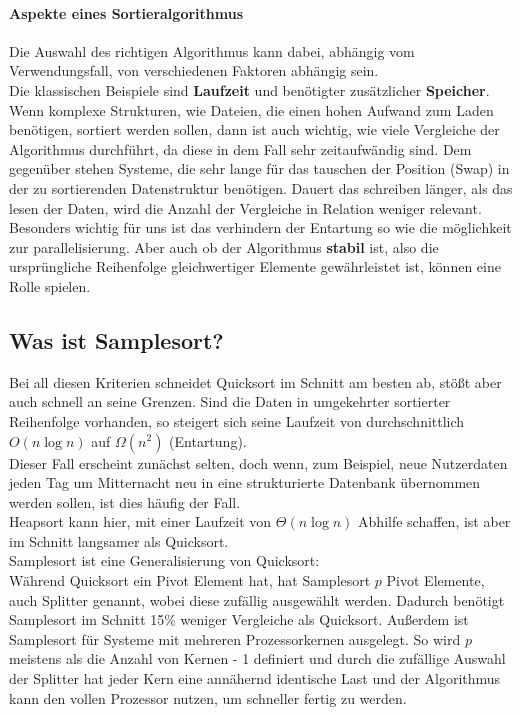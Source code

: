 		\paragraph{Aspekte eines Sortieralgorithmus}
			Die Auswahl des richtigen Algorithmus kann dabei, abhängig vom Verwendungsfall, von verschiedenen Faktoren abhängig sein.\\
			Die klassischen Beispiele sind \textbf{Laufzeit} und benötigter zusätzlicher \textbf{Speicher}.
			Wenn komplexe Strukturen, wie Dateien, die einen hohen Aufwand zum Laden benötigen, sortiert werden sollen, dann ist auch wichtig, wie viele Vergleiche der Algorithmus durchführt, da diese in dem Fall sehr zeitaufwändig sind.
			Dem gegenüber stehen Systeme, die sehr lange für das tauschen der Position (Swap) in der zu sortierenden Datenstruktur benötigen.
			Dauert das schreiben länger, als das lesen der Daten, wird die Anzahl der Vergleiche in Relation weniger relevant.\\
			Besonders wichtig für uns ist das verhindern der Entartung so wie die möglichkeit zur parallelisierung.
			Aber auch ob der Algorithmus \textbf{stabil} ist, also die ursprüngliche Reihenfolge gleichwertiger Elemente gewährleistet ist, können eine Rolle spielen.\\
			

	\subsection{Was ist Samplesort?}
		Bei all diesen Kriterien schneidet Quicksort im Schnitt am besten ab, stößt aber auch schnell an seine Grenzen. 
		Sind die Daten in umgekehrter sortierter Reihenfolge vorhanden, so steigert sich seine Laufzeit von durchschnittlich $O(n\log{n})$ auf $\Omega(n^2)$ (Entartung).\\
		Dieser Fall erscheint zunächst selten, doch wenn, zum Beispiel, neue Nutzerdaten jeden Tag um Mitternacht neu in eine strukturierte Datenbank übernommen werden sollen, ist dies häufig der Fall.\\
		Heapsort kann hier, mit einer Laufzeit von $\Theta(n\log{n})$ Abhilfe schaffen, ist aber im Schnitt langsamer als Quicksort.\\
		Samplesort ist eine Generalisierung von Quicksort:\\
		Während Quicksort ein Pivot Element hat, hat Samplesort $p$ Pivot Elemente, auch Splitter genannt, wobei diese zufällig ausgewählt werden.
		Dadurch benötigt Samplesort im Schnitt 15\% weniger Vergleiche als Quicksort. \autocite{frazer-1970}
		Außerdem ist Samplesort für Systeme mit mehreren Prozessorkernen ausgelegt.
		So wird $p$ meistens als die Anzahl von Kernen - 1 definiert und durch die zufällige Auswahl der Splitter hat jeder Kern eine annähernd identische Last und der Algorithmus kann den vollen Prozessor nutzen, um schneller fertig zu werden.\\
